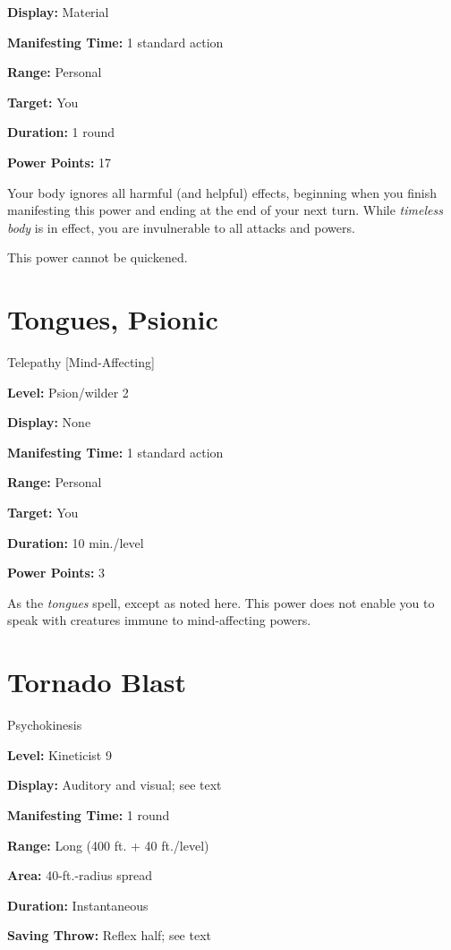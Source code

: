 \documentclass{article}
\begin{document}
\textbf{Display:} Material

\textbf{Manifesting Time:} 1 standard action

\textbf{Range:} Personal

\textbf{Target:} You

\textbf{Duration:} 1 round

\textbf{Power Points:} 17

Your body ignores all harmful (and helpful) effects, beginning when you finish 
manifesting this power and ending at the end of your next turn. While \textit{timeless 
body }is in effect, you are invulnerable to all attacks and powers.

This power cannot be quickened.

\vspace{12pt}
\section*{Tongues, Psionic}

Telepathy [Mind-Affecting]

\textbf{Level:} Psion/wilder 2

\textbf{Display:} None

\textbf{Manifesting Time:} 1 standard action

\textbf{Range:} Personal

\textbf{Target:} You

\textbf{Duration:} 10 min./level

\textbf{Power Points:} 3

As the \textit{tongues }spell, except as noted here. This power does not enable 
you to speak with creatures immune to mind-affecting powers.

\vspace{12pt}
\section*{Tornado Blast}

Psychokinesis

\textbf{Level:} Kineticist 9

\textbf{Display:} Auditory and visual; see text

\textbf{Manifesting Time:} 1 round

\textbf{Range:} Long (400 ft. + 40 ft./level)

\textbf{Area:} 40-ft.-radius spread

\textbf{Duration:} Instantaneous

\textbf{Saving Throw:} Reflex half; see text
\end{document}
